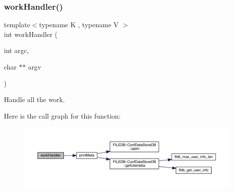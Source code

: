 \subsubsection{\texorpdfstring{workHandler()}{workHandler()}}
{\footnotesize\ttfamily template$<$typename K , typename V $>$ \\
int work\+Handler (\begin{DoxyParamCaption}\item[{int}]{argc,  }\item[{char $\ast$$\ast$}]{argv }\end{DoxyParamCaption})}



Handle all the work. 

Here is the call graph for this function\+:
\nopagebreak
\begin{figure}[H]
\begin{center}
\leavevmode
\includegraphics[width=350pt]{d5/d55/adat-devel_2main_2dbutil_2dbutil_8cc_a115ac046e9c4d74d76cec46ec78c3f9b_cgraph}
\end{center}
\end{figure}
